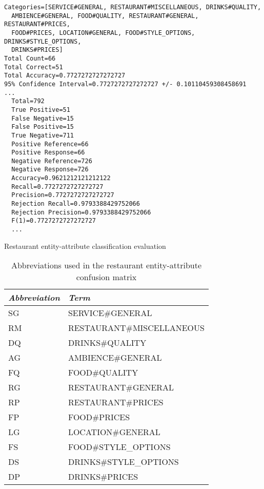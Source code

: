 \begin{listing}
\begin{verbatim}
Categories=[SERVICE#GENERAL, RESTAURANT#MISCELLANEOUS, DRINKS#QUALITY,
  AMBIENCE#GENERAL, FOOD#QUALITY, RESTAURANT#GENERAL, RESTAURANT#PRICES,
  FOOD#PRICES, LOCATION#GENERAL, FOOD#STYLE_OPTIONS, DRINKS#STYLE_OPTIONS,
  DRINKS#PRICES]
Total Count=66
Total Correct=51
Total Accuracy=0.7727272727272727
95% Confidence Interval=0.7727272727272727 +/- 0.10110459308458691
...
  Total=792
  True Positive=51
  False Negative=15
  False Positive=15
  True Negative=711
  Positive Reference=66
  Positive Response=66
  Negative Reference=726
  Negative Response=726
  Accuracy=0.9621212121212122
  Recall=0.7727272727272727
  Precision=0.7727272727272727
  Rejection Recall=0.9793388429752066
  Rejection Precision=0.9793388429752066
  F(1)=0.7727272727272727
  ...
\end{verbatim}
\caption{Restaurant entity-attribute classification evaluation}
\label{lst:classificationEvaluation}
\end{listing}

\begin{table}[ht]
\footnotesize
\centering
\begin{tabular}{ll}
\toprule
\emph{Abbreviation} & \emph{Term}\\
\midrule
SG & SERVICE\#GENERAL\\
RM & RESTAURANT\#MISCELLANEOUS\\
DQ & DRINKS\#QUALITY\\
AG & AMBIENCE\#GENERAL\\
FQ & FOOD\#QUALITY\\
RG & RESTAURANT\#GENERAL\\
RP & RESTAURANT\#PRICES\\
FP & FOOD\#PRICES\\
LG & LOCATION\#GENERAL\\
FS & FOOD\#STYLE\_OPTIONS\\
DS & DRINKS\#STYLE\_OPTIONS\\
DP & DRINKS\#PRICES\\
\bottomrule
\hline
\end{tabular}
\caption{Abbreviations used in the restaurant entity-attribute confusion matrix}
\label{tab:confMatrixAbbrev}
\end{table}

